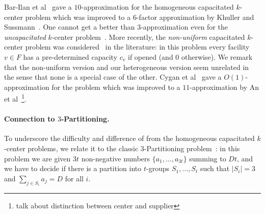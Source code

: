 Bar-Ilan et al~\cite{BKP93} gave a $10$-approximation for the homogeneous capacitated $k$-center problem which was improved to a $6$-factor approximation by Khuller and Sussmann~\cite{KS}. One cannot get a better than $3$-approximation even for the {\em uncapacitated} $k$-center problem~\cite{Hochbaum-shmoys}. More recently, the {\em non-uniform} capacitated $k$-center problem was considered~\cite{cygan-haji, an-et-al} in the literature: in this problem every facility $v\in F$ has a pre-determined capacity $c_v$ if opened (and $0$ otherwise). We remark that the non-uniform version and our heterogeneous version seem unrelated in the sense that none is a special case of the other. 
Cygan et al~\cite{cygan-haji} gave a $O(1)$-approximation for the problem which was improved to a $11$-approximation by An et al~\cite{bibid}\footnote{talk about distinction between center and supplier}.




%
% 
%
\paragraph{Connection to $3$-Partitioning.}
To underscore the difficulty and difference of \mckc from  the homogeneous capacitated $k$-center problems, we relate it to the classic $3$-Partitioning problem~\cite{Garey-Johnson}: in this problem
we are given $3t$ non-negative numbers $\{a_1,\ldots,a_{3t}\}$ summing to $Dt$, and we have to decide if there is a partition into $t$-groups $S_1,\ldots, S_t$ such that $|S_i| =  3$ and $\sum_{j\in S_i} a_j = D$ for all $i$.

